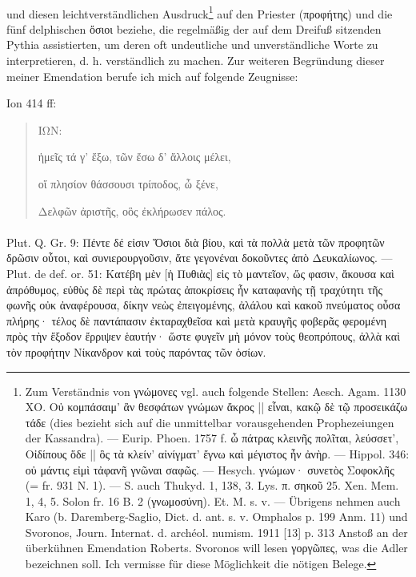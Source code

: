 \documentclass[a4paper, 11pt, oneside]{article}
\begin{document}
\paragraph{}
und diesen leichtverständlichen Ausdruck\footnote{Zum Verständnis von γνώμονες vgl. auch folgende Stellen: Aesch. Agam. 1130 ΧΟ. Οὐ κομπάσαιμ' ἂν θεσφάτων γνώμων ἄκρος || εἶναι, κακῷ δὲ τῷ προσεικάζω τάδε (dies bezieht sich auf die unmittelbar vorausgehenden Prophezeiungen der Kassandra). --- Eurip. Phoen. 1757 f. ὦ πάτρας κλεινῆς πολῖται, λεύσσετ', Οἰδίπους ὅδε || ὃς τὰ κλείν' αἰνίγματ' ἔγνω καὶ μέγιστος ἦν ἀνὴρ. --- Hippol. 346: οὐ μάντις εἰμὶ τἀφανῆ γνῶναι σαφῶς. --- Hesych. γνώμων· συνετὸς Σοφοκλῆς (= fr. 931 N. 1). --- S. auch Thukyd. 1, 138, 3. Lys. π. σηκοῦ 25. Xen. Mem. 1, 4, 5. Solon fr. 16 B. 2 (γνωμοσύνη). Et. M. s. v. --- Übrigens nehmen auch Karo (b. Daremberg-Saglio, Dict. d. ant. s. v. Omphalos p. 199 Anm. 11) und Svoronos, Journ. Internat. d. archéol. numism. 1911 [13] p. 313 Anstoß an der überkühnen Emendation Roberts. Svoronos will lesen γοργῶπες, was die Adler bezeichnen soll. Ich vermisse für diese Möglichkeit die nötigen Belege.} auf den Priester (προφήτης) und die fünf delphischen ὄσιοι beziehe, die regelmäßig der auf dem Dreifuß sitzenden Pythia assistierten, um deren oft undeutliche und unverständliche Worte zu interpretieren, d. h. verständlich zu machen. Zur weiteren Begründung dieser meiner Emendation berufe ich mich auf folgende Zeugnisse:

Ion 414 ff:
\begin{quotation}
ΙΩΝ:

ἡμεῖς τά γ' ἔξω, τῶν ἔσω δ' ἄλλοις μέλει,

οἵ πλησίον θάσσουσι τρίποδος, ὦ ξένε,

Δελφῶν ἀριστῆς, οὃς ἐκλήρωσεν πάλος.
\end{quotation}
\paragraph{}
Plut. Q. Gr. 9: Πέντε δέ εἰσιν Ὅσιοι διὰ βίου, καὶ τὰ πολλὰ μετὰ τῶν προφητῶν δρῶσιν οὗτοι, καὶ συνιερουργοῦσιν, ἅτε γεγονέναι δοκοῦντες ἀπὸ Δευκαλίωνος. --- Plut. de def. or. 51: Κατέβη μὲν [ἡ Πυθιὰς] εἰς τὸ μαντεῖον, ὥς φασιν, ἄκουσα καὶ ἀπρόθυμος, εὐθὺς δὲ περὶ τὰς πρώτας ἀποκρίσεις ἦν καταφανὴς τῇ τραχύτητι τῆς φωνῆς οὐκ ἀναφέρουσα, δίκην νεὼς ἐπειγομένης, ἀλάλου καὶ κακοῦ πνεύματος οὖσα πλήρης· τέλος δὲ παντάπασιν ἐκταραχθεῖσα καὶ μετὰ κραυγῆς φοβερᾶς φερομένη πρὸς τὴν ἔξοδον ἔρριψεν ἑαυτήν· ὥστε φυγεῖν μὴ μόνον τοὺς θεοπρόπους, ἀλλὰ καὶ τὸν προφήτην Νίκανδρον καὶ τοὺς παρόντας τῶν ὁσίων.
\end{document}
